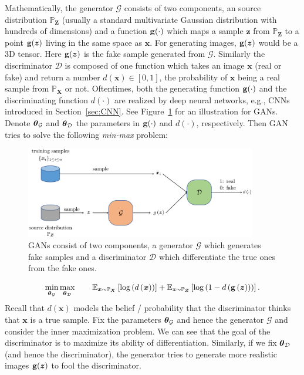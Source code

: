 Mathematically, the generator $\mathcal{G}$ consists of two components,
an source distribution $\mathbb{P}_{\bm{Z}}$ (usually a standard multivariate Gaussian distribution with hundreds of dimensions) and a function $\mathrm{\bf g}(\cdot)$ which maps a sample
$\bm{z}$ from $\mathbb{P}_{\bm{Z}}$ to a point $\mathrm{\bf g}(\bm{z})$ living
in the same space as $\bm{x}$. For generating images, $\mathrm{\bf g}(\bm{z})$ would be a 3D tensor. Here $\mathrm{\bf g}(\bm{z})$ is the fake sample
generated from $\mathcal{G}$. Similarly the discriminator $\mathcal{D}$
is composed of one function which takes an image ${\bm{x}}$ (real or fake)
and return a number $d({\bm{x}})\in[0,1]$, the probability
of ${\bm{x}}$ being a real sample from $\mathbb{P}_{\bm{X}}$ or not.
Oftentimes, both the generating function $\mathrm{\bf g}(\cdot)$ and the discriminating
function $d(\cdot)$ are realized by deep neural networks, e.g., CNNs introduced in Section~\ref{sec:CNN}. See Figure~\ref{fig:GAN} for an illustration
for GANs. Denote $\text{\boldmath $\theta$}_{\mathcal{G}}$ and $\text{\boldmath $\theta$}_{\mathcal{D}}$
the parameters in $\mathrm{\bf g}(\cdot)$ and $d(\cdot)$, respectively. Then
GAN tries to solve the following \emph{min-max }problem:
\begin{figure}
\centering\includegraphics[width=0.9\textwidth]{GAN}
\caption{GANs consist of two components, a generator $\mathcal{G}$ which generates fake samples and a discriminator $\mathcal{D}$ which differentiate the true ones from the fake ones. \label{fig:GAN}}
\end{figure}
\begin{equation}
\min_{\text{\boldmath $\theta$}_{\mathcal{G}}}\max_{\text{\boldmath $\theta$}_{\mathcal{D}}}
\qquad\mathbb{E}_{\bm{x}\sim\mathbb{P}_{\bm{X}}}\left[\log
\left(d\left(\bm{x}\right)\right)\right]
+\mathbb{E}_{\bm{z}\sim\mathbb{P}_{\bm{Z}}}\left[\log\left(1-d\left(\mathrm{\bf g}\left(\bm{z}\right)\right)\right)\right].\label{eq:GAN-original}
\end{equation}
Recall that $d(\bm{x})$ models the belief / probability that the
discriminator thinks that $\bm{x}$ is a true sample. Fix the parameters
$\text{\boldmath $\theta$}_{\mathcal{G}}$ and hence the generator $\mathcal{G}$ and
consider the inner maximization problem.
We can see that the goal
of the discriminator is to maximize its ability of differentiation.
Similarly, if we fix $\text{\boldmath $\theta$}_{\mathcal{D}}$ (and hence the discriminator),
the generator tries to generate more realistic images $\mathrm{\bf g}(\bm{z})$
to fool the discriminator.

